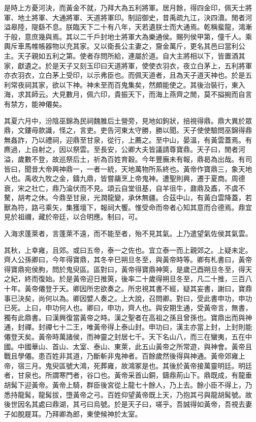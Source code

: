 是時上方憂河決，而黃金不就，乃拜大為五利將軍。居月餘，得四金印，佩天士將軍、地土將軍、大通將軍、天道將軍印。制詔御史，昔禹疏九江，決四瀆。閒者河溢皋陸，隄繇不息。朕臨天下二十有八年，天若遺朕士而大通焉。乾稱蜚龍，鴻漸于般，意庶幾與焉。其以二千戶封地士將軍大為樂通侯。賜列侯甲第，僮千人。乘輿斥車馬帷帳器物以充其家。又以衛長公主妻之，齎金萬斤，更名其邑曰當利公主。天子親如五利之第。使者存問所給，連屬於道。自大主將相以下，皆置酒其家，獻遺之。於是天子又刻玉印曰天道將軍，使使衣羽衣，夜立白茅上，五利將軍亦衣羽衣，立白茅上受印，以示弗臣也。而佩天道者，且為天子道天神也。於是五利常夜祠其家，欲以下神。神未至而百鬼集矣，然頗能使之。其後治裝行，東入海，求其師云。大見數月，佩六印，貴振天下，而海上燕齊之閒，莫不搤捥而自言有禁方，能神僊矣。

其夏六月中，汾陰巫錦為民祠魏脽后土營旁，見地如鉤狀，掊視得鼎。鼎大異於眾鼎，文鏤毋款識，怪之，言吏。吏告河東太守勝，勝以聞。天子使使驗問巫錦得鼎無姦詐，乃以禮祠，迎鼎至甘泉，從行，上薦之。至中山，晏溫，有黃雲蓋焉。有麃過，上自射之，因以祭雲。至長安，公卿大夫皆議請尊寶鼎。天子曰，閒者河溢，歲數不登，故巡祭后土，祈為百姓育穀。今年豐廡未有報，鼎曷為出哉。有司皆曰，聞昔大帝興神鼎一，一者一統，天地萬物所系終也。黃帝作寶鼎三，象天地人也。禹收九牧之金，鑄九鼎，皆嘗鬺烹上帝鬼神。遭聖則興，遷于夏商。周德衰，宋之社亡，鼎乃淪伏而不見。頌云自堂徂基，自羊徂牛，鼐鼎及鼒，不虞不驁，胡考之休。今鼎至甘泉，光潤龍變，承休無疆。合茲中山，有黃白雲降蓋，若獸為符，路弓乘矢，集獲壇下，報祠大饗。惟受命而帝者心知其意而合德焉。鼎宜見於祖禰，藏於帝廷，以合明應。制曰，可。

入海求蓬萊者，言蓬萊不遠，而不能至者，殆不見其氣。上乃遣望氣佐侯其氣雲。

其秋，上幸雍，且郊。或曰五帝，泰一之佐也。宜立泰一而上親郊之。上疑未定。齊人公孫卿曰，今年得寶鼎，其冬辛巳朔旦冬至，與黃帝時等。卿有札書曰，黃帝得寶鼎宛侯朐，問於鬼臾區。區對曰，黃帝得寶鼎神筴，是歲己酉朔旦冬至，得天之紀，終而復始。於是黃帝迎日推筴，後率二十歲得朔旦冬至，凡二十推，三百八十年。黃帝僊登于天。卿因所忠欲奏之。所忠視其書不經，疑其妄書，謝曰，寶鼎事已決矣，尚何以為。卿因嬖人奏之。上大說，召問卿。對曰，受此書申功，申功已死。上曰，申功何人也。卿曰，申功，齊人也。與安期生通，受黃帝言，無書，獨有此鼎書。曰漢興復當黃帝之時。漢之聖者在高祖之孫且曾孫也。寶鼎出而與神通，封禪。封禪七十二王，唯黃帝得上泰山封。申功曰，漢主亦當上封，上封則能僊登天矣。黃帝時萬諸侯，而神靈之封居七千。天下名山八，而三在蠻夷，五在中國。中國華山、首山、太室、泰山、東萊，此五山黃帝之所常遊，與神會。黃帝且戰且學僊。患百姓非其道，乃斷斬非鬼神者。百餘歲然後得與神通。黃帝郊雍上帝，宿三月。鬼臾區號大鴻，死葬雍，故鴻冢是也。其後於黃帝接萬靈明廷。明廷者，甘泉也。所謂寒門者，谷口也。黃帝采首山銅，鑄鼎荊山下。鼎既成，有龍垂胡髯下迎黃帝。黃帝上騎，群臣後宮從上龍七十餘人，乃上去。餘小臣不得上，乃悉持龍髯，龍髯拔，墮黃帝之弓。百姓仰望黃帝既上天，乃抱其弓與龍胡髯號。故後世因名其處曰鼎湖，其弓曰烏號。於是天子曰，嗟乎。吾誠得如黃帝，吾視去妻子如脫屣耳。乃拜卿為郎，東使候神於太室。

